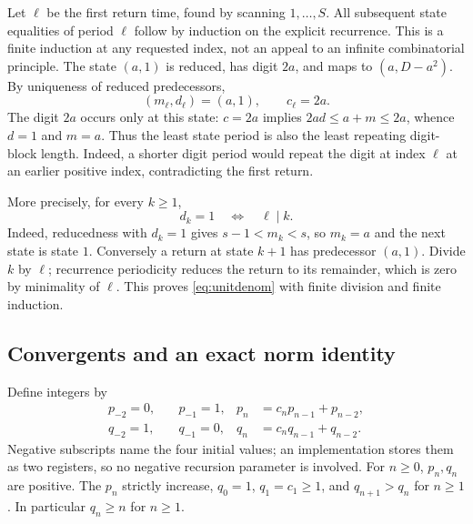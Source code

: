 \documentclass[11pt,letterpaper]{article}
\theoremstyle{definition}
\begin{document}
Let $\ell$ be the first return time, found by scanning $1,\ldots,S$.
All subsequent state equalities of period $\ell$ follow by induction on
the explicit recurrence. This is a finite induction at any requested
index, not an appeal to an infinite combinatorial principle.
The state $(a,1)$ is reduced, has digit $2a$, and maps to
$(a,D-a^2)$. By uniqueness of reduced predecessors,
\begin{equation}\label{eq:endpoint}
 (m_\ell,d_\ell)=(a,1),\qquad c_\ell=2a.
\end{equation}
The digit $2a$ occurs only at this state: $c=2a$ implies
$2ad\le a+m\le2a$, whence $d=1$ and $m=a$.
Thus the least state period is also the least repeating digit-block length.
Indeed, a shorter digit period would repeat the digit at index $\ell$ at
an earlier positive index, contradicting the first return.

More precisely, for every $k\ge1$,
\begin{equation}\label{eq:unitdenom}
 d_k=1\quad\Longleftrightarrow\quad\ell\mid k.
\end{equation}
Indeed, reducedness with $d_k=1$ gives $s-1<m_k<s$, so $m_k=a$ and
the next state is state $1$. Conversely a return at state $k+1$ has
predecessor $(a,1)$. Divide $k$ by $\ell$; recurrence periodicity reduces
the return to its remainder, which is zero by minimality of $\ell$.
This proves \eqref{eq:unitdenom} with finite division and finite induction.

\subsection{Convergents and an exact norm identity}

Define integers by
\begin{equation}\label{eq:convergents}
\begin{aligned}
 p_{-2}=0,&\quad p_{-1}=1,& p_n&=c_np_{n-1}+p_{n-2},\\
 q_{-2}=1,&\quad q_{-1}=0,& q_n&=c_nq_{n-1}+q_{n-2}.
\end{aligned}
\end{equation}
Negative subscripts name the four initial values; an implementation stores
them as two registers, so no negative recursion parameter is involved.
For $n\ge0$, $p_n,q_n$ are positive. The $p_n$ strictly increase,
$q_0=1$, $q_1=c_1\ge1$, and $q_{n+1}>q_n$ for $n\ge1$.
In particular $q_n\ge n$ for $n\ge1$.
\end{document}
